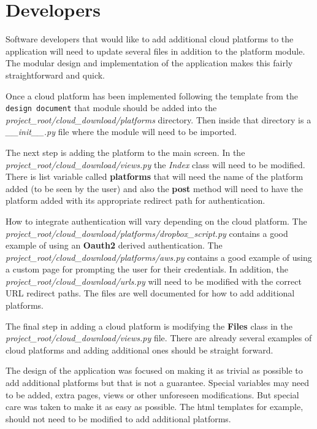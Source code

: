 \documentclass{article}
\begin{document}
    \section{Developers}
    Software developers that would like to add additional cloud platforms to the application will need to update several files in addition to the platform module. The modular design and implementation of the application makes this
    fairly straightforward and quick.

    Once a cloud platform has been implemented following the template from the \texttt{design document} that module should be added into the \textit{project\_root/cloud\_download/platforms} directory. Then inside that directory
    is a \textit{\_\_init\_\_.py} file where the module will need to be imported.

    The next step is adding the platform to the main screen. In the \textit{project\_root/cloud\_download/views.py} the \textit{Index} class will need to be modified. There is list variable called \textbf{platforms} that will need
    the name of the platform added (to be seen by the user) and also the \textbf{post} method will need to have the platform added with its appropriate redirect path for authentication.

    How to integrate authentication will vary depending on the cloud platform. The \textit{project\_root/cloud\_download/platforms/dropbox\_script.py} contains a good example of using an \textbf{Oauth2} derived authentication.
    The \textit{project\_root/cloud\_download/platforms/aws.py} contains a good example of using a custom page for prompting the user for their credentials. In addition, the
    \textit{project\_root/cloud\_download/urls.py} will need to be modified with the correct URL redirect paths. The files are well documented for how to add additional platforms.

    The final step in adding a cloud platform is modifying the \textbf{Files} class in the \textit{project\_root/cloud\_download/views.py} file. There are already several examples of cloud platforms and adding additional ones should
    be straight forward.

    The design of the application was focused on making it as trivial as possible to add additional platforms but that is not a guarantee. Special variables may need to be added, extra pages, views or other unforeseen modifications.
    But special care was taken to make it as easy as possible. The html templates for example, should not need to be modified to add additional platforms.
\end{document}
